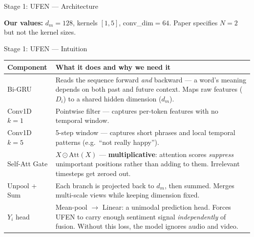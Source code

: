 \documentclass[aspectratio=169,10pt]{beamer}
\begin{document}
\begin{frame}{Stage 1: UFEN --- Architecture}

  \vspace{0.2em}
  \footnotesize\textbf{Our values:} $d_m{=}128$, kernels $[1,5]$, conv\_dim$=64$.
  Paper specifies $N{=}2$ but not the kernel sizes.
\end{frame}

\begin{frame}{Stage 1: UFEN --- Intuition}
  \centering\small
  \begin{tabular}{p{2.5cm}p{8.5cm}}
    \toprule
    \textbf{Component} & \textbf{What it does and why we need it} \\
    \midrule
    Bi-GRU & Reads the sequence forward \emph{and} backward --- a word's meaning depends on both past and future context. Maps raw features ($D_i$) to a shared hidden dimension ($d_m$). \\[4pt]
    Conv1D $k{=}1$ & Pointwise filter --- captures per-token features with no temporal window. \\[4pt]
    Conv1D $k{=}5$ & 5-step window --- captures short phrases and local temporal patterns (e.g.\ ``not really happy''). \\[4pt]
    Self-Att Gate & $X \odot \text{Att}(X)$ --- \textbf{multiplicative}: attention scores \emph{suppress} unimportant positions rather than adding to them. Irrelevant timesteps get zeroed out. \\[4pt]
    Unpool + Sum & Each branch is projected back to $d_m$, then summed. Merges multi-scale views while keeping dimension fixed. \\[4pt]
    $Y_i$ head & Mean-pool $\to$ Linear: a unimodal prediction head. Forces UFEN to carry enough sentiment signal \emph{independently} of fusion. Without this loss, the model ignores audio and video. \\
    \bottomrule
  \end{tabular}
\end{frame}
\end{document}
